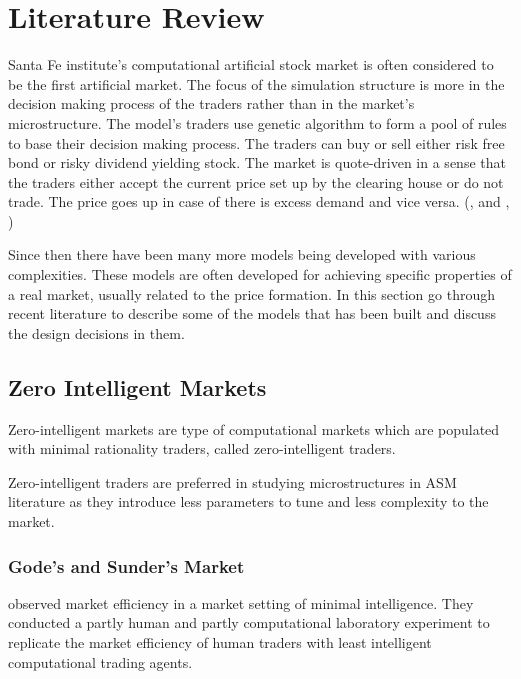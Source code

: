 \section{Literature Review}

Santa Fe institute's computational artificial stock 
market is often considered to be the first artificial market. 
The focus of the simulation structure is more in the 
decision making process of the traders rather than in the 
market's microstructure. The model's traders use 
genetic algorithm to form a pool of rules to base
their decision making process. The traders can buy or
sell either risk free bond or risky dividend yielding stock.
The market is quote-driven in a sense that the traders
either accept the current price set up by the clearing house
or do not trade. The price goes up in case of there is excess
demand and vice versa. (\citeauthor{SantaFe94}, \citeyear{SantaFe94} 
and \citeauthor{SantaFe99}, \citeyear{SantaFe99})

Since then there have been many more models being 
developed with various complexities. These models are often developed
for achieving specific properties of a real market, 
usually related to the price formation. In this section
go through recent literature to describe some of the models
that has been built and discuss the design decisions in them.



\subsection{Zero Intelligent Markets}

Zero-intelligent markets are type of computational markets
which are populated with minimal rationality traders, called
zero-intelligent traders. 

Zero-intelligent traders are preferred in studying microstructures
in ASM literature as they introduce less parameters to tune and
less complexity to the market.  %

\subsubsection{Gode's and Sunder's Market}
\citet{God93} observed market efficiency in a market setting
of minimal intelligence. They conducted a partly human and partly
computational laboratory experiment to replicate the market
efficiency of human traders with least intelligent computational
trading agents. \\

